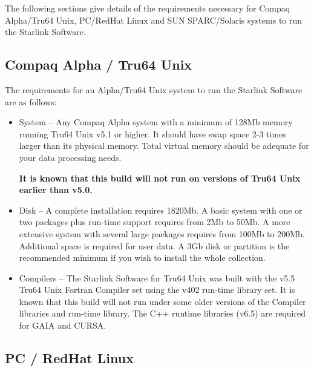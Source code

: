 \documentclass[twoside,11pt]{article}
\newcommand{\xlabel}[1]{}
\renewcommand{\_}{\texttt{\symbol{95}}}
\newcommand{\cdrom}{CD--ROM}
\newcommand{\cdrom}{CD-ROM}
\newcommand{\cdroms}{CD--ROMs}
\newcommand{\cdroms}{CD-ROMs}
\newcommand{\axpfull}{1820Mb}
\begin{document}
The following sections give details of the requirements necessary for
Compaq Alpha/Tru64 Unix, PC/RedHat Linux and SUN SPARC/Solaris
systems to run the Starlink Software.

 
\subsection{\xlabel{dec_alpha_digital_unix}Compaq Alpha / Tru64 Unix}
\label{dec_alpha_digital_unix}

The requirements for an Alpha/Tru64 Unix system to run the Starlink Software
are as follows:

\begin{itemize}

\item System -- Any Compaq Alpha system with a minimum of 128Mb memory
running Tru64 Unix v5.1 or higher.  It should have swap space 2-3
times larger than its physical memory.  Total virtual memory should be 
adequate for your data processing needs.

\textbf{It is known that this build will not run on versions of Tru64
Unix earlier than v5.0.}

\item Disk -- A complete installation requires \axpfull.
A basic system with one or two packages plus run-time support requires
from 2Mb to 50Mb.  A more extensive system with several large packages
requires from 100Mb to 200Mb.   Additional space is required for user
data.  A 3Gb disk or partition is the recommended minimum if you wish
to install the whole collection.

\item Compilers -- The Starlink Software for Tru64 Unix was built
with the v5.5 Tru64 Unix Fortran Compiler set using the v402 run-time
library set.  It is known that this build will not run under some older
versions of the Compiler libraries and run-time library.  The C++ runtime
libraries (v6.5) are required for GAIA and CURSA.

\end{itemize}

\subsection{\xlabel{intel_pc_linux}PC / RedHat Linux}
\label{intel_pc_linux}
\end{document}
